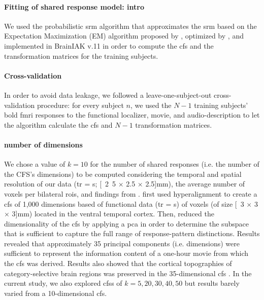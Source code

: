 \paragraph{Fitting of shared response model: intro}


We used the probabilistic \ac{srm} algorithm that approximates the \ac{srm}
based on the Expectation Maximization (EM) algorithm proposed by
\citep{chen2015reduced}, optimized by \citet{anderson2016enabling}, and
implemented in BrainIAK v.11 \citep[Brain Imaging Analysis
Kit;][]{kumar2020brainiak, kumar2020brainiaktutorial} in order to compute the
\ac{cfs} and the transformation matrices for the training subjects.


\paragraph{Cross-validation}
%
In order to avoid data leakage, we followed a leave-one-subject-out
cross-validation procedure:
%
for every subject $n$, we used the $N-1$ training subjects' \ac{bold} \ac{fmri}
responses to the functional localizer, movie, and audio-description to let the
algorithm calculate the \ac{cfs} and $N-1$ transformation matrices.


\paragraph{number of dimensions}


We chose a value of $k=10$ for the number of shared responses (i.e. the number
of the CFS's dimensions) to be computed considering the temporal and spatial
resolution of our data (\ac{tr} = \unit[2]{s}; \unit[2.5 $\times$ 2.5 $\times$
2.5]{mm}), the average number of voxels per bilateral \acp{roi}, and findings
from \citet{haxby2011common}.
%
\citet{haxby2011common} first used hyperalignment to create a \ac{cfs} of 1,000
dimensions based of functional data (\ac{tr} = \unit[3]{s}) of voxels (of size
\unit[3 $\times$ 3 $\times$ 3]{mm}) located in the ventral temporal cortex.
%
Then, \citet{haxby2011common} reduced the dimensionality of the \ac{cfs} by
applying a \ac{pca} in order to determine the subspace that is sufficient to
capture the full range of response-pattern distinctions.
%
Results revealed that approximately 35 principal components (i.e. dimensions)
were sufficient to represent the information content of a one-hour movie from
which the \ac{cfs} was derived.
%
Results also showed that the cortical topographies of category-selective brain
regions was preserved in the 35-dimensional \ac{cfs} \citep{haxby2011common}.
%
In the current study, we also explored \acp{cfs} of $k=5, 20, 30, 40, 50$ but
results barely varied from a 10-dimensional \ac{cfs}.


